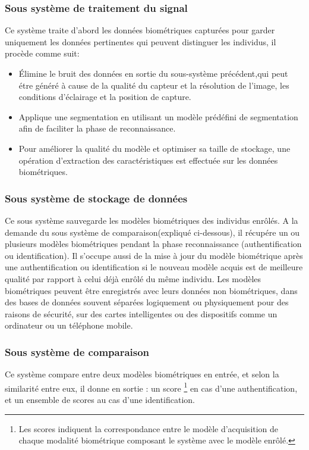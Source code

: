 \subsubsection{Sous système de traitement du signal 	}
Ce système traite d'abord les données biométriques capturées pour garder uniquement les données pertinentes qui peuvent distinguer les individus, il procède comme suit:
\begin{itemize}
	\item Élimine le bruit des données en sortie du sous-système précédent,qui peut étre généré à cause de la qualité du capteur et la résolution de l'image, les conditions d'éclairage et la position de capture.
	\item Applique une segmentation en utilisant un modèle prédéfini de segmentation afin de faciliter la phase de reconnaissance.
	\item Pour améliorer la qualité du modèle et optimiser sa taille de stockage, une opération d’extraction des caractéristiques est effectuée sur les données biométriques.
\end{itemize}

\subsubsection{Sous système de stockage de données}
Ce sous système sauvegarde les modèles biométriques des individus enrôlés. A la demande du sous système de comparaison(expliqué ci-dessous), il récupére un ou plusieurs modèles biométriques pendant la phase reconnaissance (authentification ou identification). Il s'occupe aussi de la mise à jour du modèle biométrique après une authentification ou identification si le nouveau modèle acquis est de meilleure qualité par rapport à celui déjà enrôlé du même individu.
Les modèles biométriques peuvent être enregistrés avec leurs données non biométriques, dans des bases de données souvent séparées logiquement ou physiquement pour des raisons de sécurité, sur des cartes intelligentes ou des dispositifs comme un ordinateur ou un téléphone mobile.
\subsubsection{Sous système de comparaison}
Ce système compare entre deux modèles biométriques en entrée, et selon la similarité entre eux, il donne en sortie : un score \footnote{Les scores indiquent la correspondance entre le modèle d’acquisition de chaque modalité biométrique composant le système avec le modèle enrôlé.} en cas d'une authentification, et un ensemble de scores au cas d'une identification.
